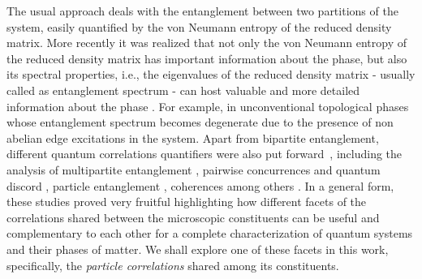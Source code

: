 \documentclass[prb,reprint,showpacs,twocolumn,superscriptaddress]{revtex4-2}
\begin{document}
The usual approach deals with the entanglement between two partitions of the system, easily quantified by the von Neumann entropy of the reduced density matrix. 
More recently it was realized that not only the von Neumann entropy of the reduced density matrix has important information about the phase, but also its spectral properties, i.e., the eigenvalues of the reduced density matrix - usually called as entanglement spectrum - can host valuable and more detailed information about the phase \cite{Li2008,Fidkowski2010,Turner2011}. For example, in unconventional topological phases whose entanglement spectrum becomes degenerate due to the presence 
of non abelian edge excitations in the system. Apart from bipartite entanglement, different quantum correlations  quantifiers were also put forward~\cite{amico08,ModiReview2012,HorodeckiReview2009,AlexanderReview2017}, including the analysis of multipartite entanglement \cite{amico08,TRO2006b,Hofmann2014,Konstantin2017,Antonio2020},  pairwise concurrences and quantum discord \cite{ModiReview2012,Beggi2016,Osterloh2002,Iemini2016_concurrence,Campbell2017_concurrence,Lima2021}, particle entanglement \cite{Iemini2015,Alexandradinata2011,Hatem2017,Masudul2009,Herdman2015,Zhao2010,Lukas2017,Masudul2007,Tullio2019}, coherences \cite{AlexanderReview2017,Vianna2016} among others \cite{Chiara2018,bagrov2020}. In a general form, these studies proved very fruitful highlighting how different facets of the correlations shared between the microscopic constituents can be useful and complementary to each other for a complete characterization of quantum systems and their phases of matter. We shall explore one of these facets in this work, specifically, the \textit{particle correlations} shared among its constituents.
\end{document}
